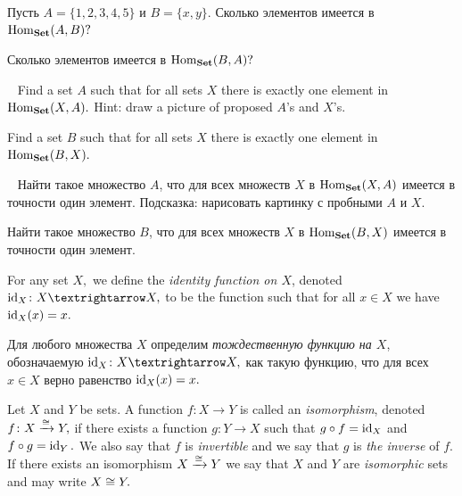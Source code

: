 \documentclass[../main/CT4S-EN-RU]{subfiles}
\begin{document}
\begin{exerciseRUS}
Пусть $A=\{1,2,3,4,5\}$ и $B=\{x,y\}.$ 
\sexc Сколько элементов имеется в $\operatorname{Hom}_{\mathbf{Set}}(A,B)?$ 
\item Сколько элементов имеется в $\operatorname{Hom}_{\mathbf{Set}}(B,A)?$
\endsexc
\end{exerciseRUS}

\begin{exerciseENG}~
\sexc Find a set $A$ such that for all sets $X$ there is exactly one element in $\operatorname{Hom}_{\mathbf{Set}}(X,A).$ Hint: draw a picture of proposed $A$'s and $X$'s.
\item Find a set $B$ such that for all sets $X$ there is exactly one element in $\operatorname{Hom}_{\mathbf{Set}}(B,X).$
\endsexc 
\end{exerciseENG}

\begin{exerciseRUS}~
\sexc Найти такое множество $A$, что для всех множеств $X$ в $\operatorname{Hom}_{\mathbf{Set}}(X,A)$ имеется в точности один элемент. Подсказка: нарисовать картинку с пробными $A$ и $X.$
\item Найти такое множество $B$, что для всех множеств $X$ в $\operatorname{Hom}_{\mathbf{Set}}(B,X)$ имеется в точности один элемент.
\endsexc 
\end{exerciseRUS}

\begin{blockENG}
For any set $X,$ we define the {\em identity function on $X$}, denoted $\id_X\colon X{→} X,$ to be the function such that for all $x\in X$ we have $\operatorname{id}_X(x)=x.$
\end{blockENG}

\begin{blockRUS}
Для любого множества $X$ определим {\em тождественную функцию на $X$}, обозначаемую $\id_X\colon X{→} X,$ как такую функцию, что для всех $x\in X$ верно равенство $\operatorname{id}_X(x)=x.$
\end{blockRUS}

\begin{definitionENG}[Isomorphism]\label{def:iso in set} 
Let $X$ and $Y$ be sets. A function $f\colon X{→} Y$ is called an {\em isomorphism}, denoted $f\colon X\xrightarrow{\cong}Y,$ if there exists a function $g\colon Y{→} X$ such that $g\circ f=\operatorname{id}_X$ and $f\circ g=\operatorname{id}_Y.$ We also say that $f$ is {\em invertible} and we say that $g$ is {\em the inverse} of $f.$ If there exists an isomorphism $X\xrightarrow{\cong} Y$ we say that $X$ and $Y$ are {\em isomorphic} sets and may write $X\cong Y.$ 
\end{definitionENG}
\end{document}
